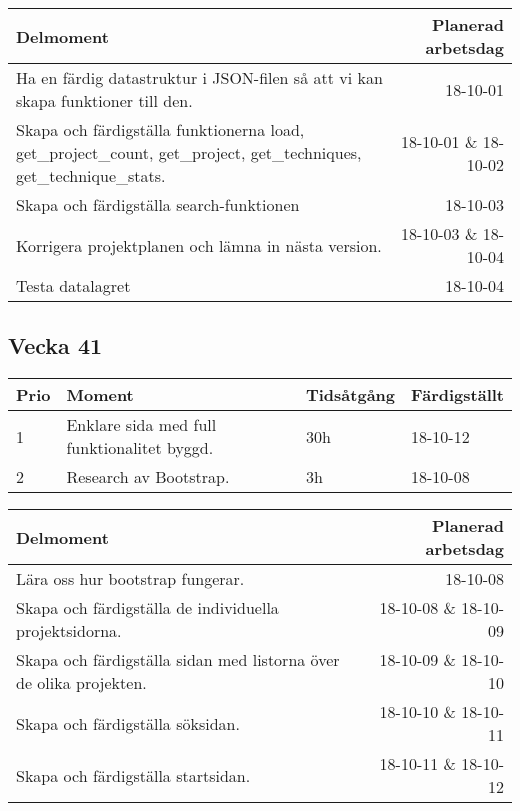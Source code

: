 \documentclass{TDP003mall}
\begin{document}
\begin{table}[!h]
\begin{tabularx}{\linewidth}{|X|r|}\hline
    \textbf{Delmoment} & \textbf{ Planerad arbetsdag} \\\hline
    Ha en färdig datastruktur i JSON-filen så att vi kan skapa funktioner till den. & 18-10-01 \\\hline
    Skapa och färdigställa funktionerna load, get\_project\_count, get\_project, get\_techniques, get\_technique\_stats.  & 18-10-01 \& 18-10-02 \\\hline
    Skapa och färdigställa search-funktionen & 18-10-03 \\\hline
    Korrigera projektplanen och lämna in nästa version. & 18-10-03 \& 18-10-04 \\\hline
    Testa datalagret & 18-10-04 \\\hline
\end{tabularx}
\end{table}

\subsection{Vecka 41}
\begin{table}[!h]
\begin{tabularx}{\linewidth}{|l|X|l|l|}\hline
\textbf{Prio} & \textbf{Moment} & \textbf{Tidsåtgång} & \textbf{Färdigställt}\\\hline
1& Enklare sida med full funktionalitet byggd. & 30h & 18-10-12 \\\hline
2& Research av Bootstrap. & 3h & 18-10-08 \\\hline
\end{tabularx}
\end{table}

\begin{table}[!h]
\begin{tabularx}{\linewidth}{|X|r|}\hline
    \textbf{Delmoment} & \textbf{ Planerad arbetsdag} \\\hline
    Lära oss hur bootstrap fungerar. & 18-10-08 \\\hline
    Skapa och färdigställa de individuella projektsidorna. & 18-10-08 \& 18-10-09 \\\hline
    Skapa och färdigställa sidan med listorna över de olika projekten. & 18-10-09 \& 18-10-10 \\\hline
    Skapa och färdigställa söksidan. & 18-10-10 \& 18-10-11 \\\hline
    Skapa och färdigställa startsidan. & 18-10-11 \& 18-10-12 \\\hline
\end{tabularx}
\end{table}
\newpage
\end{document}
